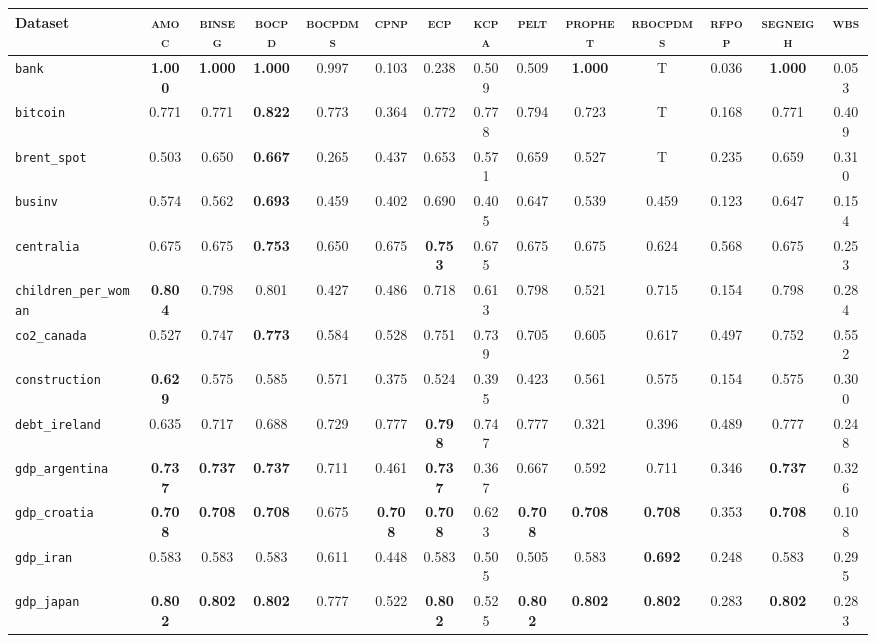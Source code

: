 \begin{tabular}{lccccccccccccc}
Dataset & \textsc{amoc} & \textsc{binseg} & \textsc{bocpd} & \textsc{bocpdms} & \textsc{cpnp} & \textsc{ecp} & \textsc{kcpa} & \textsc{pelt} & \textsc{prophet} & \textsc{rbocpdms} & \textsc{rfpop} & \textsc{segneigh} & \textsc{wbs}\\
\hline
\verb+bank+ & \textbf{1.000} & \textbf{1.000} & \textbf{1.000} & 0.997 & 0.103 & 0.238 & 0.509 & 0.509 & \textbf{1.000} & T & 0.036 & \textbf{1.000} & 0.053\\
\verb+bitcoin+ & 0.771 & 0.771 & \textbf{0.822} & 0.773 & 0.364 & 0.772 & 0.778 & 0.794 & 0.723 & T & 0.168 & 0.771 & 0.409\\
\verb+brent_spot+ & 0.503 & 0.650 & \textbf{0.667} & 0.265 & 0.437 & 0.653 & 0.571 & 0.659 & 0.527 & T & 0.235 & 0.659 & 0.310\\
\verb+businv+ & 0.574 & 0.562 & \textbf{0.693} & 0.459 & 0.402 & 0.690 & 0.405 & 0.647 & 0.539 & 0.459 & 0.123 & 0.647 & 0.154\\
\verb+centralia+ & 0.675 & 0.675 & \textbf{0.753} & 0.650 & 0.675 & \textbf{0.753} & 0.675 & 0.675 & 0.675 & 0.624 & 0.568 & 0.675 & 0.253\\
\verb+children_per_woman+ & \textbf{0.804} & 0.798 & 0.801 & 0.427 & 0.486 & 0.718 & 0.613 & 0.798 & 0.521 & 0.715 & 0.154 & 0.798 & 0.284\\
\verb+co2_canada+ & 0.527 & 0.747 & \textbf{0.773} & 0.584 & 0.528 & 0.751 & 0.739 & 0.705 & 0.605 & 0.617 & 0.497 & 0.752 & 0.552\\
\verb+construction+ & \textbf{0.629} & 0.575 & 0.585 & 0.571 & 0.375 & 0.524 & 0.395 & 0.423 & 0.561 & 0.575 & 0.154 & 0.575 & 0.300\\
\verb+debt_ireland+ & 0.635 & 0.717 & 0.688 & 0.729 & 0.777 & \textbf{0.798} & 0.747 & 0.777 & 0.321 & 0.396 & 0.489 & 0.777 & 0.248\\
\verb+gdp_argentina+ & \textbf{0.737} & \textbf{0.737} & \textbf{0.737} & 0.711 & 0.461 & \textbf{0.737} & 0.367 & 0.667 & 0.592 & 0.711 & 0.346 & \textbf{0.737} & 0.326\\
\verb+gdp_croatia+ & \textbf{0.708} & \textbf{0.708} & \textbf{0.708} & 0.675 & \textbf{0.708} & \textbf{0.708} & 0.623 & \textbf{0.708} & \textbf{0.708} & \textbf{0.708} & 0.353 & \textbf{0.708} & 0.108\\
\verb+gdp_iran+ & 0.583 & 0.583 & 0.583 & 0.611 & 0.448 & 0.583 & 0.505 & 0.505 & 0.583 & \textbf{0.692} & 0.248 & 0.583 & 0.295\\
\verb+gdp_japan+ & \textbf{0.802} & \textbf{0.802} & \textbf{0.802} & 0.777 & 0.522 & \textbf{0.802} & 0.525 & \textbf{0.802} & \textbf{0.802} & \textbf{0.802} & 0.283 & \textbf{0.802} & 0.283\\

\end{tabular}
